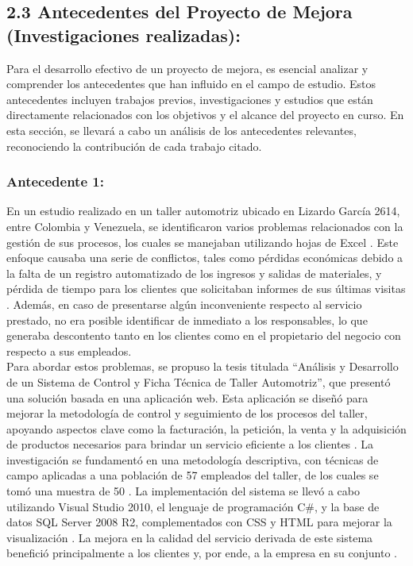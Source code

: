 \subsection{2.3 Antecedentes del Proyecto de Mejora (Investigaciones realizadas): }
Para el desarrollo efectivo de un proyecto de mejora, es esencial analizar y comprender los antecedentes que han influido en el campo de estudio. Estos antecedentes incluyen  trabajos previos, investigaciones y estudios que están directamente relacionados con los objetivos y el alcance del proyecto en curso.
En esta sección, se llevará a cabo un análisis de los antecedentes relevantes, reconociendo la contribución de cada trabajo citado. 

\subsubsection*{Antecedente 1:}
En un estudio realizado en un taller automotriz ubicado en Lizardo García 2614, entre Colombia y Venezuela, se identificaron varios problemas relacionados con la gestión de sus procesos, los cuales se manejaban utilizando hojas de Excel . Este enfoque causaba una serie de conflictos, tales como pérdidas económicas debido a la falta de un registro automatizado de los ingresos y salidas de materiales, y pérdida de tiempo para los clientes que solicitaban informes de sus últimas visitas . Además, en caso de presentarse algún inconveniente respecto al servicio prestado, no era posible identificar de inmediato a los responsables, lo que generaba descontento tanto en los clientes como en el propietario del negocio con respecto a sus empleados.\\
Para abordar estos problemas, se propuso la tesis titulada “Análisis y Desarrollo de un Sistema de Control y Ficha Técnica de Taller Automotriz”, que presentó una solución basada en una aplicación web. Esta aplicación se diseñó para mejorar la metodología de control y seguimiento de los procesos del taller, apoyando aspectos clave como la facturación, la petición, la venta y la adquisición de productos necesarios para brindar un servicio eficiente a los clientes . La investigación se fundamentó en una metodología descriptiva, con técnicas de campo aplicadas a una población de 57 empleados del taller, de los cuales se tomó una muestra de 50 . La implementación del sistema se llevó a cabo utilizando Visual Studio 2010, el lenguaje de programación C\#, y la base de datos SQL Server 2008 R2, complementados con CSS y HTML para mejorar la visualización .
La mejora en la calidad del servicio derivada de este sistema benefició principalmente a los clientes y, por ende, a la empresa en su conjunto .

